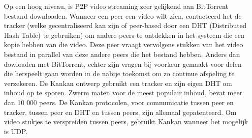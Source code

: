 
Op een hoog niveau, is P2P video streaming zeer gelijkend aan BitTorrent bestand downloaden. Wanneer een peer een video wilt zien, contacteerd het de tracker (welke gecentraliseerd kan zijn of peer-based door een DHT (Distributed Hash Table) te gebruiken) om andere peers te ontdekken in het systeem die een kopie hebben van die video. Deze peer vraagt vervolgens stukken van het video bestand in parallel van deze andere peers die het bestand hebben. Anders dan dowloaden met BitTorrent, echter zijn vragen bij voorkeur gemaakt voor delen die herspeelt gaan worden in de nabije toekomst om zo continue afspeling te verzekeren. De Kankan ontwerp gebruikt een tracker en zijn eigen DHT om inhoud op te sporen. Zwerm maten voor de meest populair inhoud, bevat meer dan 10 000 peers. De Kankan protocolen, voor communicatie tussen peer en tracker, tussen peer en DHT en tussen peers, zijn allemaal gepatenteerd. Om video stukjes te verspreiden tussen peers, gebruikt Kankan wanneer het mogelijk is UDP.
